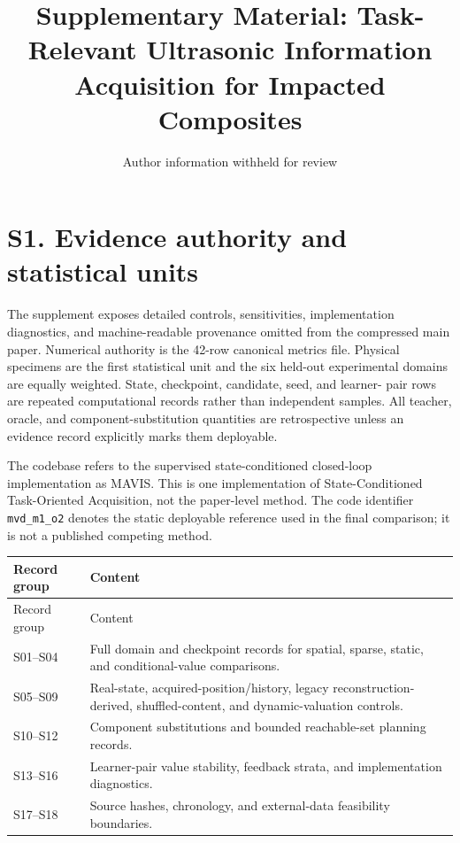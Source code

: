 \documentclass[11pt]{article}
\title{Supplementary Material: Task-Relevant Ultrasonic Information
Acquisition for Impacted Composites}
\author{Author information withheld for review}
\date{}
\begin{document}
\maketitle

\section{S1. Evidence authority and statistical units}

The supplement exposes detailed controls, sensitivities, implementation
diagnostics, and machine-readable provenance omitted from the compressed main
paper. Numerical authority is the 42-row canonical metrics file. Physical
specimens are the first statistical unit and the six held-out experimental
domains are equally weighted. State, checkpoint, candidate, seed, and learner-
pair rows are repeated computational records rather than independent samples.
All teacher, oracle, and component-substitution quantities are retrospective
unless an evidence record explicitly marks them deployable.

The codebase refers to the supervised state-conditioned closed-loop
implementation as MAVIS. This is one implementation of State-Conditioned
Task-Oriented Acquisition, not the paper-level method. The code identifier
\texttt{mvd\_m1\_o2} denotes the static deployable reference used in the final
comparison; it is not a published competing method.

\begin{longtable}{@{}>{\raggedright\arraybackslash}p{}>{\raggedright\arraybackslash}p{}@{}}
\toprule
Record group & Content \\
\midrule
\endfirsthead
\toprule
Record group & Content \\
\midrule
\endhead
\bottomrule
\endfoot
S01--S04 & Full domain and checkpoint records for spatial, sparse, static, and conditional-value comparisons. \\
S05--S09 & Real-state, acquired-position/history, legacy reconstruction-derived, shuffled-content, and dynamic-valuation controls. \\
S10--S12 & Component substitutions and bounded reachable-set planning records. \\
S13--S16 & Learner-pair value stability, feedback strata, and implementation diagnostics. \\
S17--S18 & Source hashes, chronology, and external-data feasibility boundaries. \\
\end{longtable}
\end{document}
